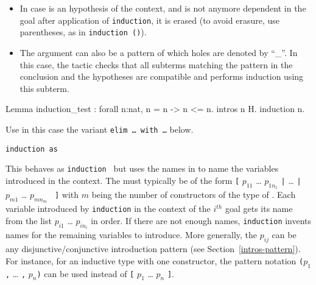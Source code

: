 \begin{coq_example*}
\begin{itemize}
\item In case {\term} is an hypothesis {\ident} of the context,
  and {\ident} is not anymore dependent in the goal after
  application of {\tt induction}, it is erased (to avoid erasure, use
  parentheses, as in {\tt induction ({\ident})}).

\item The argument {\term} can also be a pattern of which holes are
  denoted by ``\_''. In this case, the tactic checks that all subterms
  matching the pattern in the conclusion and the hypotheses are
  compatible and performs induction using this subterm.

\end{itemize}

\Example

\begin{coq_example}
Lemma induction_test : forall n:nat, n = n -> n <= n.
intros n H.
induction n.
\end{coq_example}

\begin{ErrMsgs}
\item {}
\item {}

  Use in this case
  the variant {\tt elim \dots\ with \dots} below.
\end{ErrMsgs}

\begin{Variants}
\item{\tt induction {\term} as {\disjconjintropattern}}

  This behaves as {\tt induction {\term}} but uses the names in
  {\disjconjintropattern} to name the variables introduced in the context.
  The {\disjconjintropattern} must typically be of the form
  {\tt [} $p_{11}$ {\ldots}
  $p_{1n_1}$ {\tt |} {\ldots} {\tt |} $p_{m1}$ {\ldots} $p_{mn_m}$ {\tt
    ]} with $m$ being the number of constructors of the type of
  {\term}. Each variable introduced by {\tt induction} in the context
  of the $i^{th}$ goal gets its name from the list $p_{i1}$ {\ldots}
  $p_{in_i}$ in order. If there are not enough names, {\tt induction}
  invents names for the remaining variables to introduce. More
  generally, the $p_{ij}$ can be any disjunctive/conjunctive
  introduction pattern (see Section~\ref{intros-pattern}). For instance,
  for an inductive type with one constructor, the pattern notation
  {\tt (}$p_{1}$ {\tt ,} {\ldots} {\tt ,} $p_{n}${\tt )} can be used instead of
  {\tt [} $p_{1}$ {\ldots} $p_{n}$ {\tt ]}.


\end{Variants}
\end{coq_example*}
